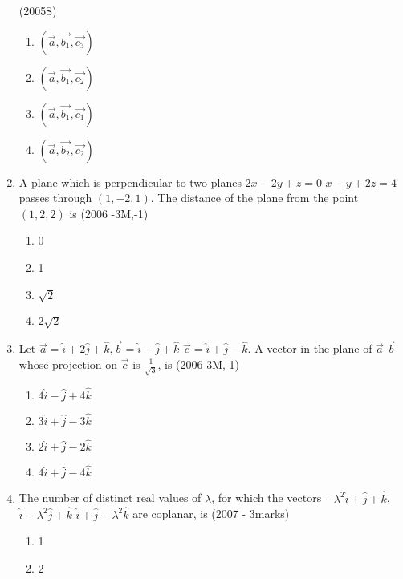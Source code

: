 \documentclass[journal,12pt,onecolumn]{IEEEtran}
\theoremstyle{remark}
\begin{document}
\begin{enumerate}
    \hfill{(2005S)}
    \begin{multicols}{2}
    \begin{enumerate}
    \item $(\vec{a}, \vec{b_1}, \vec{c_3})$
    \item $(\vec{a}, \vec{b_1}, \vec{c_2})$
    \item $(\vec{a}, \vec{b_1}, \vec{c_1})$
    \item $(\vec{a}, \vec{b_2}, \vec{c_2})$
    \end{enumerate}
    \end{multicols}
    \item A plane which is perpendicular to two planes $2x-2y+z=0$  $x-y+2z=4$ passes through $(1,-2,1)$. The distance of the plane from the point $(1,2,2)$ is
    \hfill{(2006 -3M,-1)}
    \begin{multicols}{2} 
    \begin{enumerate}
    \item 0
    \item 1
    \item $\sqrt{2}$
    \item $2\sqrt{2}$
    \end{enumerate}
    \end{multicols}
    \item Let $\vec{a} = \hat{i} + 2\hat{j} + \hat{k}, \vec{b} = \hat{i}-\hat{j}+\hat{k}$  $\vec{c}= \hat{i}+\hat{j}-\hat{k}$. A vector in the plane of $\vec{a}$  $\vec{b}$ whose projection on $\vec{c}$ is $\frac{1}{\sqrt{3}}$, is
    \hfill{(2006-3M,-1)}
    \begin{enumerate}
    \item $4\hat{i} - \hat{j} + 4\hat{k}$
    \item $3\hat{i} + \hat{j} - 3\hat{k}$
    \item $2\hat{i} + \hat{j} - 2\hat{k}$
    \item $4\hat{i} + \hat{j} - 4\hat{k}$
    \end{enumerate}
    \item The number of distinct real values of $\lambda$, for which the vectors $-\lambda^{2}\hat{i} + \hat{j} + \hat{k}$, $\hat{i} - \lambda^{2}\hat{j} + \hat{k}$  $\hat{i} + \hat{j} - \lambda^{2}\hat{k}$ are coplanar, is
    \hfill{(2007 - 3marks)}
    \begin{multicols}{2} 
    \begin{enumerate}
    \item 1
    \item 2

\end{enumerate}
\end{multicols}
\end{enumerate}
\end{document}
